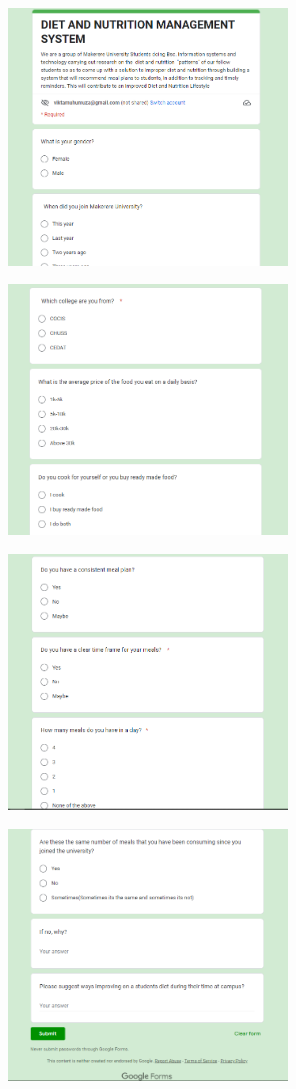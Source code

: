 \documentclass{article}
\begin{document}
\vspace{30pt}
\begin{center}

    \includegraphics[width=280px]{images/questionnaire1.PNG}

    \includegraphics[width=280px]{images/questionnaire2.PNG}

    \includegraphics[width=280px]{images/questionnaire3.PNG}

    \includegraphics[width=280px]{images/questionnaire4.PNG}
\end{center}
\end{document}
